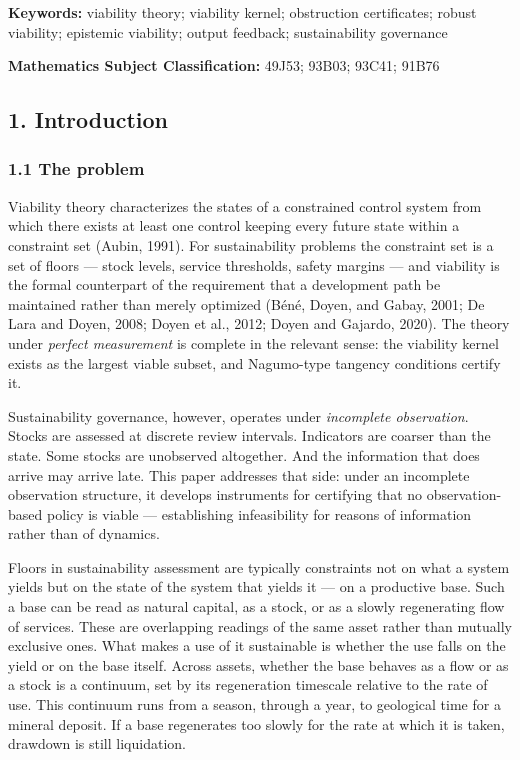 \documentclass[11pt]{article}
\theoremstyle{definition}
\begin{document}
\textbf{Keywords:} viability theory; viability kernel; obstruction
certificates; robust viability; epistemic viability; output feedback;
sustainability governance

\textbf{Mathematics Subject Classification:} 49J53; 93B03; 93C41; 91B76

\subsection{1. Introduction}\label{introduction}

\subsubsection{1.1 The problem}\label{the-problem}

Viability theory characterizes the states of a constrained control
system from which there exists at least one control keeping every future
state within a constraint set (Aubin, 1991). For sustainability problems
the constraint set is a set of floors --- stock levels, service
thresholds, safety margins --- and viability is the formal counterpart
of the requirement that a development path be maintained rather than
merely optimized (B\'en\'e, Doyen, and Gabay, 2001; De Lara and Doyen, 2008;
Doyen et al., 2012; Doyen and Gajardo, 2020). The theory under
\emph{perfect measurement} is complete in the relevant sense: the
viability kernel exists as the largest viable subset, and Nagumo-type
tangency conditions certify it.

Sustainability governance, however, operates under \emph{incomplete
observation}. Stocks are assessed at discrete review intervals.
Indicators are coarser than the state. Some stocks are unobserved
altogether. And the information that does arrive may arrive late. This paper addresses that side: under an incomplete observation structure, it develops instruments for certifying that no
observation-based policy is viable --- establishing infeasibility for
reasons of information rather than of dynamics.

Floors in sustainability assessment are typically constraints not on
what a system yields but on the state of the system that yields it ---
on a productive base. Such a base can be read as natural capital, as a
stock, or as a slowly regenerating flow of services. These are
overlapping readings of the same asset rather than mutually exclusive
ones. What makes a use of it sustainable is whether the use falls on the
yield or on the base itself. Across assets, whether the base behaves as
a flow or as a stock is a continuum, set by its regeneration timescale
relative to the rate of use. This continuum runs from a season, through
a year, to geological time for a mineral deposit. If a base regenerates
too slowly for the rate at which it is taken, drawdown is still
liquidation.
\end{document}
